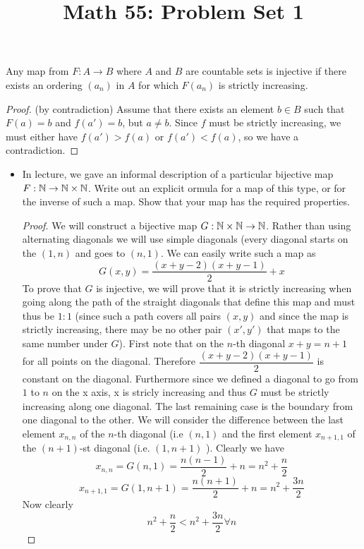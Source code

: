 \title{Math 55: Problem Set 1}

\maketitle
\begin{lemma}
Any map from $F: A\to B$ where $A$ and $B$ are countable sets is injective if there exists an ordering $(a_n)$ in $A$ for which $F(a_n)$ is strictly increasing. 
\begin{proof} (by contradiction)
Assume that there exists an element $b\in B$ such that $F(a)=b$ and $f(a')=b$, but $a\neq b$. Since $f$ must be strictly increasing, we must either have $f(a')>f(a)$ or $f(a')<f(a)$, so we have a contradiction.
\end{proof}
\end{lemma}
\begin{itemize}
\item In lecture, we gave an informal description of a particular bijective map $F: \mathbb{N} \to \mathbb{N}\times \mathbb{N}$. Write out an explicit ormula for a map of this type, or for the inverse of such a map. Show that your map has the
required properties.
\begin{proof}
We will construct a bijective map $G: \mathbb{N}\times\mathbb{N}\to\mathbb{N}$. Rather than using alternating diagonals we will use simple diagonals (every diagonal starts on the $(1,n)$ and goes to $(n,1)$. We can easily write such a map as
\[ G(x,y) = \dfrac{(x+y-2)(x+y-1)}{2}+x \]
To prove that $G$ is injective, we will prove that it is strictly increasing when going along the path of the straight diagonals that define this map and must thus be $1:1$ (since such a path covers all pairs $(x,y)$ and since the map is strictly increasing, there may be no other pair $(x',y')$ that maps to the same number under $G$). First note that on the  $n$-th diagonal $x+y=n+1$ for all points on the diagonal. Therefore $\dfrac{(x+y-2)(x+y-1)}{2}$ is constant on the diagonal. Furthermore since we defined a diagonal to go from $1$ to $n$ on the x axis, x is stricly increasing and thus $G$ must be strictly increasing along one diagonal. The last remaining case is the boundary from one diagonal to the other. We will consider the difference between the last element $x_{n,n}$ of the $n$-th diagonal (i.e  $(n,1)$ and the first element $x_{n+1,1}$ of the $(n+1)$-st diagonal (i.e. $(1,n+1)$ ). Clearly we have
\[ x_{n,n} = G(n,1) = \dfrac{n(n-1)}{2} + n = n^2 + \dfrac{n}{2} \]
\[ x_{n+1,1} = G(1,n+1) = \dfrac{n(n+1)}{2} + n = n^2 + \dfrac{3n}{2} \]
Now clearly
\[ n^2 + \dfrac{n}{2} < n^2 + \dfrac{3n}{2} \forall n \]

\end{proof}
\end{itemize}
